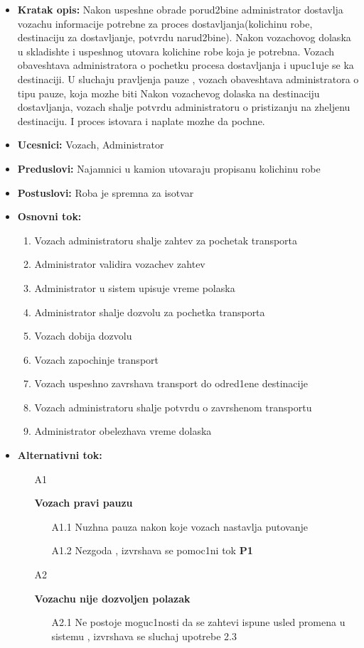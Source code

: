  \begin{itemize}
		\item {\textbf{Kratak opis:} Nakon uspeshne obrade porud2bine administrator dostavlja vozachu informacije potrebne za proces 			dostavljanja(kolichinu robe, destinaciju za dostavljanje, potvrdu narud2bine). Nakon vozachovog dolaska u skladishte i uspeshnog utovara kolichine robe koja je potrebna. Vozach obaveshtava administratora o pochetku procesa dostavljanja i upuc1uje se ka destinaciji. U sluchaju pravljenja pauze , vozach obaveshtava administratora o tipu pauze, koja mozhe biti Nakon vozachevog dolaska na destinaciju dostavljanja, vozach shalje potvrdu administratoru o pristizanju na zheljenu destinaciju. I proces istovara i naplate mozhe da pochne.}
		\item{\textbf{Ucesnici:} Vozach, Administrator}
		\item{\textbf{Preduslovi:}  Najamnici u kamion utovaraju propisanu  kolichinu robe }
		\item{\textbf{Postuslovi:}  Roba je spremna za isotvar}
		\item{\textbf{Osnovni tok:}  
			\begin{enumerate}
				\item{Vozach administratoru shalje zahtev za pochetak transporta}
				\item{Administrator validira vozachev zahtev}
				\item {Administrator u sistem upisuje vreme polaska}
				\item{Administrator shalje dozvolu za pochetka transporta}
				\item{Vozach dobija dozvolu}
				\item{Vozach zapochinje transport }
				\item{Vozach uspeshno zavrshava transport do odred1ene destinacije}
				\item {Vozach administratoru shalje potvrdu o zavrshenom transportu}
				\item{Administrator obelezhava vreme dolaska}
		\end{enumerate}}
	\item{\textbf{Alternativni tok:} 
		 \begin{itemize}
			\item[A{1}]{\textbf{Vozach pravi pauzu}
				 \begin{itemize}
					\item[A{1.1}] {Nuzhna pauza nakon koje vozach nastavlja putovanje}
					\item[A{1.2}] {Nezgoda , izvrshava se pomoc1ni tok  \textbf{P{1}}}
				\end{itemize}
								} 
			\item[A{2}] {\textbf{Vozachu nije dozvoljen polazak} 
				\begin{itemize}
					\item[A{2.1}]{Ne postoje moguc1nosti da se zahtevi ispune usled promena u sistemu , izvrshava se sluchaj upotrebe 2.3}
				\end{itemize}		
		
}
\end{itemize}}
\end{itemize}

